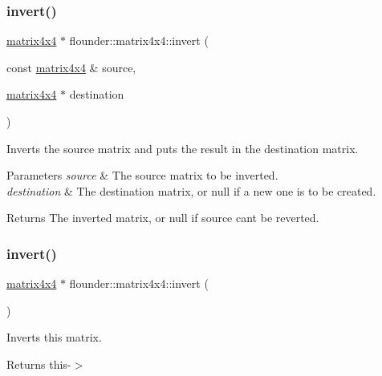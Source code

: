 \subsubsection{\texorpdfstring{invert()}{invert()}\hspace{0.1cm}{\footnotesize\ttfamily [1/2]}}
{\footnotesize\ttfamily \hyperlink{classflounder_1_1matrix4x4}{matrix4x4} $\ast$ flounder\+::matrix4x4\+::invert (\begin{DoxyParamCaption}\item[{const \hyperlink{classflounder_1_1matrix4x4}{matrix4x4} \&}]{source,  }\item[{\hyperlink{classflounder_1_1matrix4x4}{matrix4x4} $\ast$}]{destination }\end{DoxyParamCaption})\hspace{0.3cm}{\ttfamily [static]}}



Inverts the source matrix and puts the result in the destination matrix. 


\begin{DoxyParams}{Parameters}
{\em source} & The source matrix to be inverted. \\
\hline
{\em destination} & The destination matrix, or null if a new one is to be created. \\
\hline
\end{DoxyParams}
\begin{DoxyReturn}{Returns}
The inverted matrix, or null if source can\textquotesingle{}t be reverted. 
\end{DoxyReturn}
\mbox{\label{classflounder_1_1matrix4x4_ad8959f0c459bb67eb884806f7303c468}} 
\subsubsection{\texorpdfstring{invert()}{invert()}\hspace{0.1cm}{\footnotesize\ttfamily [2/2]}}
{\footnotesize\ttfamily \hyperlink{classflounder_1_1matrix4x4}{matrix4x4} $\ast$ flounder\+::matrix4x4\+::invert (\begin{DoxyParamCaption}{ }\end{DoxyParamCaption})}



Inverts this matrix. 

\begin{DoxyReturn}{Returns}
this-\/$>$ 
\end{DoxyReturn}
\mbox{\label{classflounder_1_1matrix4x4_a971e94747366db81af609bb97da9b2ed}} 
